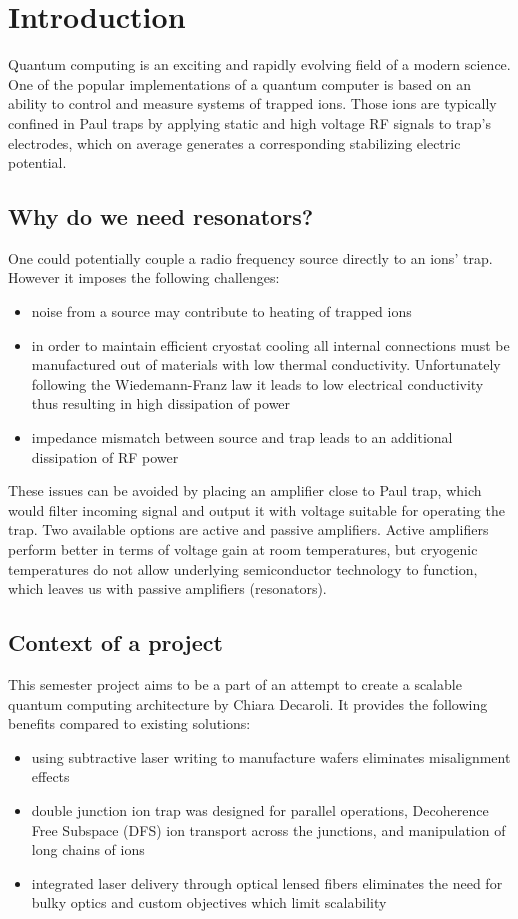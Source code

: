 \newcommand{\package}{\emph}

\chapter{Introduction}
Quantum computing is an exciting and rapidly evolving field of a modern science. One of the popular implementations of a quantum computer is based on an ability to control and measure systems of trapped ions. Those ions are typically confined in Paul \cite{Paul1990} traps by applying static and high voltage RF signals to trap's electrodes, which on average generates a corresponding stabilizing electric potential.
\section{Why do we need resonators?}
\label{sec:why_resonators}
One could potentially couple a radio frequency source directly to an ions' trap. However it imposes the following challenges:
\begin{itemize}
	\item noise from a source may contribute to heating of trapped ions \cite{Turchette2000}
	\item in order to maintain efficient cryostat cooling all internal connections must be manufactured out of materials with low thermal conductivity. Unfortunately following the Wiedemann-Franz law \cite{Franz1853} it leads to low electrical conductivity thus resulting in high dissipation of power
	\item impedance mismatch between source and trap leads to an additional dissipation of RF power
\end{itemize}
These issues can be avoided by placing an amplifier close to Paul trap, which would filter incoming signal and output it with voltage suitable for operating the trap. Two available options are active and passive amplifiers. Active amplifiers perform better in terms of voltage gain at room temperatures, but cryogenic temperatures do not allow underlying semiconductor technology to function, which leaves us with passive amplifiers (resonators).
\section{Context of a project}
\label{sec:context}
This semester project aims to be a part of an attempt to create a scalable quantum computing architecture by Chiara Decaroli. It provides the following benefits compared to existing solutions:
\begin{itemize}
	\item using subtractive laser writing to manufacture wafers eliminates misalignment effects
	\item double junction ion trap was designed for parallel operations, Decoherence Free Subspace (DFS) ion transport across the junctions, and manipulation of long chains of ions
	\item integrated laser delivery through optical lensed fibers eliminates the need for bulky optics and custom objectives which limit scalability
\end{itemize}

